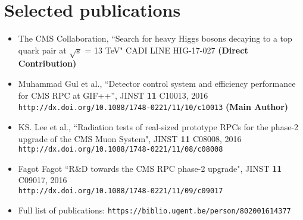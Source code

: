 \documentclass[a4paper,10pt]{article}
\begin{document}
\section{Selected publications}
\begin{itemize}
\item The CMS Collaboration, ``Search for heavy Higgs bosons decaying to a top quark pair at $\sqrt{s}$  = 13 TeV"  CADI LINE HIG-17-027 \textbf{(Direct Contribution)}
\item Muhammad Gul et al., ``Detector control system and efficiency performance for CMS RPC at GIF++”, JINST \textbf{11} C10013, 2016 \\
\texttt{http://dx.doi.org/10.1088/1748-0221/11/10/c10013}  \textbf{(Main Author)}
\item KS. Lee et al., ``Radiation tests of real-sized prototype RPCs for the phase-2 upgrade of the CMS Muon System", JINST \textbf{11} C08008, 2016 \\
\texttt{http://dx.doi.org/10.1088/1748-0221/11/08/c08008}
\item Fagot Fagot ``R\&D towards the CMS RPC phase-2 upgrade", JINST \textbf{11} C09017, 2016\\ \texttt{http://dx.doi.org/10.1088/1748-0221/11/09/c09017}
\item Full list of publications:
\texttt{https://biblio.ugent.be/person/802001614377}

\end{itemize}


\end{document}
